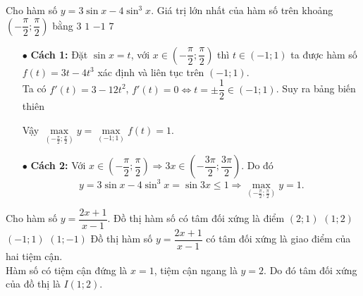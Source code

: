 \begin{ex}%
    Cho hàm số $y=3\sin{x}-4\sin^3{x}$. Giá trị lớn nhất của hàm số trên khoảng $\left(-\dfrac{\pi}{2};\dfrac{\pi}{2} \right)$ bằng
    \choice
    {$3$}
    {\True $1$}
    {$-1$}
    {$7$}
    \loigiai
    {\begin{itemize}
            \item [$\bullet$] \textbf{Cách 1:} Đặt $\sin{x}=t$, với $x\in \left(-\dfrac{\pi}{2};\dfrac{\pi}{2}\right)$ thì $t\in (-1;1)$ ta được hàm số $f(t)=3t-4t^3$ xác định và liên tục trên $(-1;1)$.\\
            Ta có $f'(t)=3-12t^2$, $f'(t)=0\Leftrightarrow t=\pm \dfrac{1}{2}\in (-1;1)$. Suy ra bảng biến thiên
            \begin{center}
            \end{center}
        Vậy $\max\limits_{ \left(-\tfrac{\pi}{2};\tfrac{\pi}{2}\right)}y =\max\limits_{(-1;1)}f(t)=1$.
            \item [$\bullet$] \textbf{Cách 2:} Với $x\in \left(-\dfrac{\pi}{2};\dfrac{\pi}{2}\right)\Rightarrow 3x\in \left(-\dfrac{3\pi}{2};\dfrac{3\pi}{2}\right)$. Do đó
            \[y=3\sin{x}-4\sin^3{x}=\sin3x\leq 1\Rightarrow \max\limits_{ \left(-\tfrac{\pi}{2};\tfrac{\pi}{2}\right)}y=1.\]
    \end{itemize}}
\end{ex}

\begin{ex}%
	Cho hàm số $y=\dfrac{2x+1}{x-1}$. Đồ thị hàm số có tâm đối xứng là điểm
	\choice
	{$(2;1)$}
	{\True $(1;2)$}
	{$(-1;1)$}
	{$(1;-1)$}
	\loigiai
	{Đồ thị hàm số $y=\dfrac{2x+1}{x-1}$ có tâm đối xứng là giao điểm của hai tiệm cận.\\
	Hàm số có tiệm cận đứng là $x=1$, tiệm cận ngang là $y=2$. Do đó tâm đối xứng của đồ thị là $I(1;2)$.}
\end{ex}

